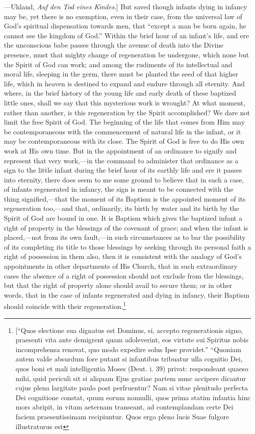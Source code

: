 \documentclass[english,]{book}
\begin{document}
{  ---Uhland, \emph{Auf den Tod eines Kindes}.{]}} But saved though infants dying in infancy may be, yet there is no exemption, even in their case, from the universal law of God's spiritual dispensation towards men, that ``except a man be born again, he cannot see the kingdom of God.'' Within the brief hour of an infant's life, and ere the unconscious babe passes through the avenue of death into the Divine presence, must that mighty change of regeneration be undergone, which none but the Spirit of God can work; and among the rudiments of its intellectual and moral life, sleeping in the germ, there must be planted the seed of that higher life, which in heaven is destined to expand and endure through all eternity. And where, in the brief history of the young life and early death of these baptized little ones, shall we say that this mysterious work is wrought? At what moment, rather than another, is this regeneration by the Spirit accomplished? We dare not limit the free Spirit of God. The beginning of the life that comes from Him may be contemporaneous with the commencement of natural life in the infant, or it may be contemporaneous with its close. The Spirit of God is free to do His own work at His own time. But in the appointment of an ordinance to signify and represent that very work,---in the command to administer that ordinance as a sign to the little infant during the brief hour of its earthly life and ere it passes into eternity, there does seem to me some ground to believe that in such a case, of infants regenerated in infancy, the sign is meant to be connected with the thing signified,---that the moment of its Baptism is the appointed moment of its regeneration too,---and that, ordinarily, its birth by water and its birth by the Spirit of God are bound in one. It is Baptism which gives the baptized infant a right of property in the blessings of the covenant of grace; and when the infant is placed,---not from its own fault,---in such circumstances as to bar the possibility of its completing its title to those blessings by seeking through its personal faith a right of possession in them also, then it is consistent with the analogy of God's appointments in other departments of His Church, that in such extraordinary cases the absence of a right of possession should not exclude from the blessings, but that the right of property alone should avail to secure them; or in other words, that in the case of infants regenerated and dying in infancy, their Baptism should coincide with their regeneration.\footnote{{[}``Quos electione sua dignatus est Dominus, si, accepto regenerationis signo, praesenti vita ante demigrent quam adoleverint, eos virtute sui Spiritus nobis incomprehensa renovat, quo modo expedire solus Ipse providet.'' ``Quoniam autem valde absurdum fore putant si infantibus tribuatur ulla cognitio Dei, quos boni et mali intelligentia Moses (Deut. i. 39) privat: respondeant quaeso mihi, quid periculi sit si aliquam Ejus gratiae partem nunc accipere dicantur cujus plena largitate paulo post perfruentur? Nam si vitae plenitudo perfecta Dei cognitione constat, quum eorum nonnulli, quos prima statim infantia hinc mors abripit, in vitam aeternam transeant, ad contemplandam certe Dei faciem praesentissimam recipiuntur. Quos ergo pleno lucis Suae fulgore illustraturus est }
\end{document}
